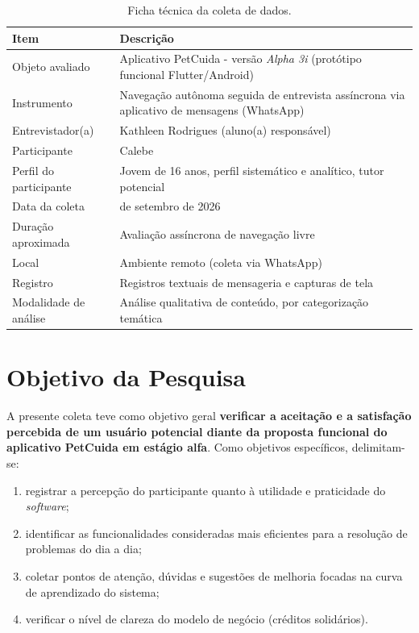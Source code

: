\documentclass[12pt,a4paper]{article}
\newcommand{\entrevistador}{Kathleen Rodrigues}
\newcommand{\participante}{Calebe}
\begin{document}
\begin{table}[h!]
\centering
\begin{tabular}{@{}>{\raggedright\arraybackslash}p{4.8cm}>{\raggedright\arraybackslash}p{8.9cm}@{}}
\toprule
\textbf{Item} & \textbf{Descrição} \\
\midrule
Objeto avaliado & Aplicativo PetCuida - versão \textit{Alpha 3i} (protótipo funcional Flutter/Android) \\
Instrumento & Navegação autônoma seguida de entrevista assíncrona via aplicativo de mensagens (WhatsApp) \\
Entrevistador(a) & \entrevistador{} (aluno(a) responsável) \\
Participante & \participante{} \\
Perfil do participante & Jovem de 16 anos, perfil sistemático e analítico, tutor potencial \\
Data da coleta & 16 de setembro de 2026 \\
Duração aproximada & Avaliação assíncrona de navegação livre \\
Local & Ambiente remoto (coleta via WhatsApp) \\
Registro & Registros textuais de mensageria e capturas de tela \\
Modalidade de análise & Análise qualitativa de conteúdo, por categorização temática \\
\bottomrule
\end{tabular}
\caption{Ficha técnica da coleta de dados.}
\end{table}

\section{Objetivo da Pesquisa}

A presente coleta teve como objetivo geral \textbf{verificar a aceitação e a satisfação percebida de um usuário potencial diante da proposta funcional do aplicativo PetCuida em estágio alfa}. Como objetivos específicos, delimitam-se:

\begin{enumerate}[label=\alph*)]
  \item registrar a percepção do participante quanto à utilidade e praticidade do \textit{software};
  \item identificar as funcionalidades consideradas mais eficientes para a resolução de problemas do dia a dia;
  \item coletar pontos de atenção, dúvidas e sugestões de melhoria focadas na curva de aprendizado do sistema;
  \item verificar o nível de clareza do modelo de negócio (créditos solidários).
\end{enumerate}
\end{document}
